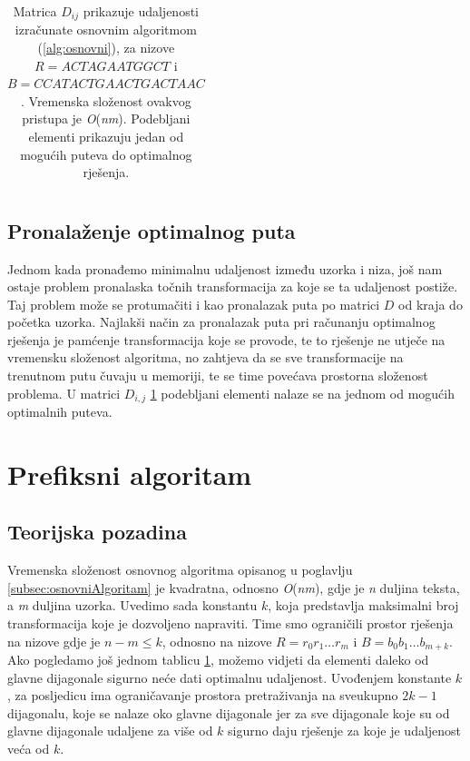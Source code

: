 \documentclass[times, utf8, zavrsni]{fer}
\begin{document}
\begin{table}[]
\begin{tabular}{|ll|llllllllllllllll|}
\end{tabular}
\caption{Matrica $D_{ij}$ prikazuje udaljenosti izračunate osnovnim algoritmom (\ref{alg:osnovni}), za nizove $R = ACTAGAATGGCT$ i  $B = CCATACTGAACTGACTAAC$. Vremenska složenost ovakvog pristupa je \textit{O}(\textit{nm}). Podebljani elementi prikazuju jedan od mogućih puteva do optimalnog rješenja.}
\label{tab:matricaDij}
\end{table}

\subsection{Pronalaženje optimalnog puta}
Jednom kada pronađemo minimalnu udaljenost između uzorka i niza, još nam ostaje problem pronalaska točnih transformacija za koje se ta udaljenost postiže. Taj problem može se protumačiti i kao pronalazak puta po matrici $D$ od kraja do početka uzorka. Najlakši način za pronalazak puta pri računanju optimalnog rješenja je pamćenje transformacija koje se provode, te to rješenje ne utječe na vremensku složenost algoritma, no zahtjeva da se sve transformacije na trenutnom putu čuvaju u memoriji, te se time povećava prostorna složenost problema. U matrici $D_{i,j}$ \ref{tab:matricaDij} podebljani elementi nalaze se na jednom od mogućih optimalnih puteva.

\section{Prefiksni algoritam}\label{sec:prefiksniAlg}
\subsection{Teorijska pozadina}
Vremenska složenost osnovnog algoritma opisanog u poglavlju \ref{subsec:osnovniAlgoritam} je kvadratna, odnosno \textit{O}(\textit{nm}), gdje je \textit{n} duljina teksta, a \textit{m} duljina uzorka. Uvedimo sada konstantu $k$, koja predstavlja maksimalni broj transformacija koje je dozvoljeno napraviti. Time smo ograničili prostor rješenja na nizove gdje je $n-m \leq k$, odnosno na nizove \(R = r_{0}r_{1}{\dots}r_{m}\) i \(B = b_{0}b_{1}{\dots}b_{m+k}\). Ako pogledamo još jednom tablicu \ref{tab:matricaDij}, možemo vidjeti da elementi daleko od glavne dijagonale sigurno neće dati optimalnu udaljenost. Uvođenjem konstante $k$, za posljedicu ima ograničavanje prostora pretraživanja na sveukupno $2k-1$ dijagonalu, koje se nalaze oko glavne dijagonale jer za sve dijagonale koje su od glavne dijagonale udaljene za više od $k$ sigurno daju rješenje za koje je udaljenost veća od $k$. 
\end{document}
